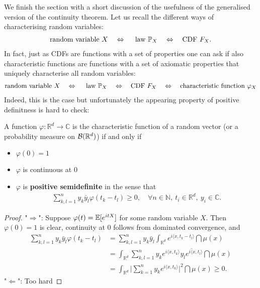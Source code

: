We finish the section with a short discussion of the usefulness of the generalised version of the continuity theorem. Let us recall the different ways of characterising random variables: 
\begin{align*}
	\text{random variable }X\quad \Leftrightarrow \quad \text{ law }\P_X\quad \Leftrightarrow \quad \text{CDF }F_X.
\end{align*}
In fact, just as CDFs are functions with a set of properties one can ask if also characteristic functions are functions with a set of axiomatic properties that uniquely characterise all random variables:
\begin{align*}
	\text{random variable }X\quad \Leftrightarrow \quad \text{ law }\P_X\quad \Leftrightarrow \quad \text{CDF }F_X\quad \Leftrightarrow\quad \text{characteristic function }\varphi_X
\end{align*}
Indeed, this is the case but unfortunately the appearing property of positive definitness is hard to check:
\begin{laussagewerkzeug}
\begin{theorem}[Bochner]\label{Bochner}
	A function $\varphi \colon \mathbb{R}^d \to \mathbb{C}$ is the characteristic function of a random vector (or a probability measure on $\mathcal B(\R^d)$) if and only if 
	\begin{itemize}
		\item $\varphi(0)=1$
		\item $\varphi$ is continuous at $0$
		\item $\varphi$ is \textbf{positive semidefinite} in the sense that
		\begin{align*}
			\sum_{k,l=1}^{n} y_k \bar{y}_l \varphi(t_k - t_l) \geq 0, \quad \forall n \in \mathbb{N}, \: t_i \in \mathbb{R}^d, \: y_i \in \mathbb{C}.
		\end{align*}	
	\end{itemize}
\end{theorem}
\end{laussagewerkzeug}
\begin{proof}[Proof]
	"$\Rightarrow$": Suppose $\varphi(t)=\E[e^{itX}]$ for some random variable $X$. Then $\varphi(0) = 1$ is clear, continuity at $0$ follows from dominated convergence, and
		\begin{align*}
			\sum_{k,l=1}^n y_k \bar{y}_l \varphi (t_k - t_l) &= \sum_{k,l=1}^n y_k \bar{y}_l \int_{\mathbb{R}^d} e^{i \langle x, t_k - t_l \rangle} \dint \mu(x) \\
				&= \int_{\mathbb{R}^d} \sum_{k,l=1}^n y_k e^{i \langle x ,t_k \rangle} \overline{y_l e^{i \langle x ,t_l \rangle}} \dint \mu(x) \\
				&= \int_{\mathbb{R}^d} \Big\lvert \sum_{k=1}^n y_k e^{i \langle x , t_k \rangle} \Big\rvert^2 \dint \mu(x) \geq 0.
		\end{align*}
	"$\Leftarrow$": Too hard
\end{proof}
